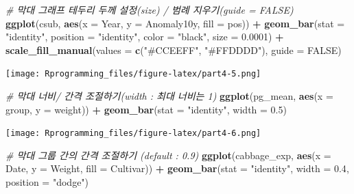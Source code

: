\documentclass[10pt,]{krantz}
\makeatletter
\newenvironment{Shaded}{\begin{snugshade}}{\end{snugshade}}
\newcommand{\KeywordTok}[1]{\textcolor[rgb]{0.13,0.29,0.53}{\textbf{#1}}}
\newcommand{\DataTypeTok}[1]{\textcolor[rgb]{0.13,0.29,0.53}{#1}}
\newcommand{\FloatTok}[1]{\textcolor[rgb]{0.00,0.00,0.81}{#1}}
\newcommand{\StringTok}[1]{\textcolor[rgb]{0.31,0.60,0.02}{#1}}
\newcommand{\CommentTok}[1]{\textcolor[rgb]{0.56,0.35,0.01}{\textit{#1}}}
\newcommand{\OtherTok}[1]{\textcolor[rgb]{0.56,0.35,0.01}{#1}}
\newcommand{\OperatorTok}[1]{\textcolor[rgb]{0.81,0.36,0.00}{\textbf{#1}}}
\newcommand{\NormalTok}[1]{#1}
\newenvironment{kframe}{%
\medskip{}
\setlength{\fboxsep}{.8em}
 \def\at@end@of@kframe{}%
 \ifinner\ifhmode%
  \def\at@end@of@kframe{\end{minipage}}%
  \begin{minipage}{\columnwidth}%
 \fi\fi%
 \def\FrameCommand##1{\hskip\@totalleftmargin \hskip-\fboxsep
 \colorbox{shadecolor}{##1}\hskip-\fboxsep
     \hskip-\linewidth \hskip-\@totalleftmargin \hskip\columnwidth}%
 \MakeFramed {\advance\hsize-\width
   \@totalleftmargin\z@ \linewidth\hsize
   \@setminipage}}%
 {\par\unskip\endMakeFramed%
 \at@end@of@kframe}
\renewenvironment{Shaded}{\begin{kframe}}{\end{kframe}}
\theoremstyle{definition}
\theoremstyle{definition}
\theoremstyle{remark}
\makeatother
\begin{document}
\begin{Shaded}
\begin{Highlighting}[]


\CommentTok{# 막대 그래프 테두리 두께 설정(size) / 범례 지우기(guide = FALSE)}
\KeywordTok{ggplot}\NormalTok{(csub, }\KeywordTok{aes}\NormalTok{(}\DataTypeTok{x =}\NormalTok{ Year, }\DataTypeTok{y =}\NormalTok{ Anomaly10y, }\DataTypeTok{fill =}\NormalTok{ pos)) }\OperatorTok{+}\StringTok{ }\KeywordTok{geom_bar}\NormalTok{(}\DataTypeTok{stat =} \StringTok{"identity"}\NormalTok{, }\DataTypeTok{position =} \StringTok{"identity"}\NormalTok{, }\DataTypeTok{color =} \StringTok{"black"}\NormalTok{, }\DataTypeTok{size =} \FloatTok{0.0001}\NormalTok{) }\OperatorTok{+}\StringTok{ }
\StringTok{  }\KeywordTok{scale_fill_manual}\NormalTok{(}\DataTypeTok{values =} \KeywordTok{c}\NormalTok{(}\StringTok{"#CCEEFF"}\NormalTok{, }\StringTok{"#FFDDDD"}\NormalTok{), }\DataTypeTok{guide =} \OtherTok{FALSE}\NormalTok{)}
\end{Highlighting}
\end{Shaded}

\texttt{[image: Rprogramming\_files/figure-latex/part4-5.png]}

\begin{Shaded}
\begin{Highlighting}[]


\CommentTok{# 막대 너비/ 간격 조절하기(width : 최대 너비는 1)}
\KeywordTok{ggplot}\NormalTok{(pg_mean, }\KeywordTok{aes}\NormalTok{(}\DataTypeTok{x =}\NormalTok{ group, }\DataTypeTok{y =}\NormalTok{ weight)) }\OperatorTok{+}\StringTok{ }\KeywordTok{geom_bar}\NormalTok{(}\DataTypeTok{stat =} \StringTok{"identity"}\NormalTok{, }\DataTypeTok{width =} \FloatTok{0.5}\NormalTok{)}
\end{Highlighting}
\end{Shaded}

\texttt{[image: Rprogramming\_files/figure-latex/part4-6.png]}

\begin{Shaded}
\begin{Highlighting}[]


\CommentTok{# 막대 그룹 간의 간격 조절하기 (default : 0.9) }
\KeywordTok{ggplot}\NormalTok{(cabbage_exp, }\KeywordTok{aes}\NormalTok{(}\DataTypeTok{x =}\NormalTok{ Date, }\DataTypeTok{y =}\NormalTok{ Weight, }\DataTypeTok{fill =}\NormalTok{ Cultivar)) }\OperatorTok{+}\StringTok{ }\KeywordTok{geom_bar}\NormalTok{(}\DataTypeTok{stat =} \StringTok{"identity"}\NormalTok{, }\DataTypeTok{width =} \FloatTok{0.4}\NormalTok{, }\DataTypeTok{position =} \StringTok{"dodge"}\NormalTok{)}
\end{Highlighting}
\end{Shaded}
\end{document}
